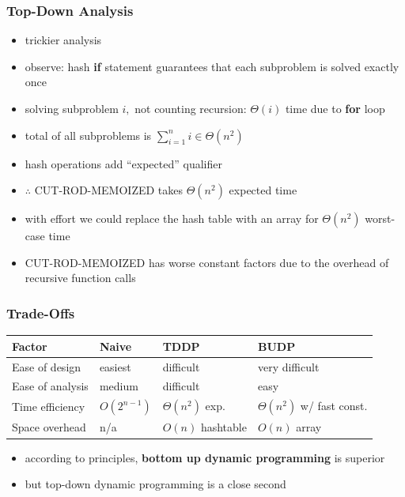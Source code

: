 \documentclass{beamer}
\begin{document}
\begin{frame} \frametitle{Top-Down Analysis}
    \begin{itemize}
      \item trickier analysis
      \item observe: hash \textbf{if} statement guarantees that each subproblem is solved exactly once
      \item solving subproblem $i,$ not counting recursion: $\Theta(i)$ time due to \textbf{for} loop
      \item total of all subproblems is $\sum_{i=1}^n i \in \Theta(n^2)$
      \item hash operations add ``expected'' qualifier
      \item $\therefore$ CUT-ROD-MEMOIZED takes $\Theta(n^2)$ expected time
      \item with effort we could replace the hash table with an array for $\Theta(n^2)$ worst-case time
      \item CUT-ROD-MEMOIZED has worse constant factors due to the overhead of recursive function calls
    \end{itemize}
\end{frame}

\begin{frame} \frametitle{Trade-Offs}
\begin{center}
  \begin{tabular}{llll}
    \textbf{Factor} & \textbf{Naive} & \textbf{TDDP} & \textbf{BUDP} \\ \hline
    Ease of design & easiest & difficult & very difficult \\
    Ease of analysis & medium & difficult & easy \\
    Time efficiency & $O(2^{n-1})$ & $\Theta(n^2)$ exp. & $\Theta(n^2)$ w/ fast const. \\
    Space overhead & n/a & $O(n)$ hashtable & $O(n)$ array \\
  \end{tabular}
\end{center}

\begin{itemize}
  \item according to principles, \textbf{bottom up dynamic programming} is superior
  \item but top-down dynamic programming is a close second
\end{itemize}
\end{frame}
\end{document}
